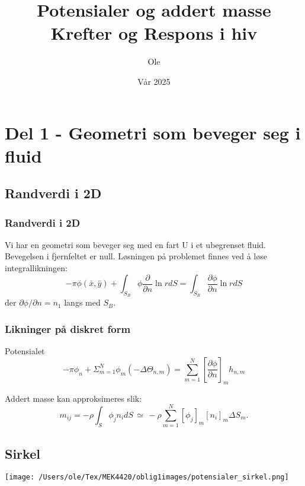 \documentclass{beamer}
\title{Potensialer og addert masse \\Krefter og Respons i hiv}
\author{Ole}
\date{Vår 2025}
\begin{document}
\frame{\titlepage}

\section[Outline]{} %
\frame{\tableofcontents}

\section{Del 1 - Geometri som beveger seg i fluid}
\subsection{Randverdi i 2D}
\begin{frame}
  \frametitle{Randverdi i 2D}
  Vi har en geometri som beveger seg med en fart U i et ubegrenset fluid. Bevegelsen i fjernfeltet er null. 
Løsningen på problemet finnes ved å løse integrallikningen:
\begin{equation}
    -\pi \phi(\bar{x},\bar{y})  + \int_{S_B} \phi  \frac{\partial }{\partial n} \ln r dS = \int_{S_B}  \frac{\partial \phi}{\partial n} \ln r dS
\end{equation} %
der $\partial \phi / \partial n = n_1$ langs med $S_B$. %
\end{frame}

\begin{frame}
  \frametitle{Likninger på diskret form}
 Potensialet
\begin{equation}
    -\pi \phi_n  + \Sigma_{m=1}^N \phi_m (-\Delta \Theta_{n,m})   =  \sum_{m=1}^N [\frac{\partial \phi}{\partial n}]_m h_{n,m}
\end{equation}

Addert masse kan approksimeres slik:
\begin{equation}
    m_{ij}  = -\rho \int_{S} \phi_j n_i dS \, \simeq \, -\rho \sum_{m=1}^N [\phi_j]_m  [n_i]_m \Delta S_m.
\end{equation}

\end{frame}
\subsection{Sirkel}
\begin{frame}
\texttt{[image: /Users/ole/Tex/MEK4420/oblig1images/potensialer\_sirkel.png]}
\end{frame}
\end{document}
